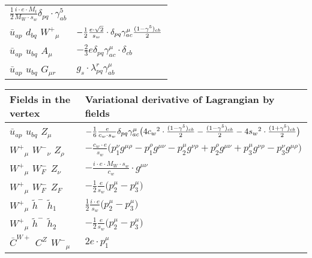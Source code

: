 \begin{center}
\begin{tabular}{|l|l|}
	$\frac{1}{2}\frac{ i \cdot e \cdot M_t}{ M_W \cdot s_w}\delta_{p q} \cdot \gamma_{a b}^5 $\\[2mm]
$\bar{u}{}_{a p }$ \phantom{-} $d{}_{b q }$ \phantom{-} $W^+{}_{\mu }$ \phantom{-}  &
	$-\frac{1}{2}\frac{ e \cdot\sqrt{2}}{ s_w}\cdot \delta_{p q} \gamma_{a c}^\mu {(1-\gamma^5)_{c b}\over 2} $\\[2mm]
$\bar{u}{}_{a p }$ \phantom{-} $u{}_{b q }$ \phantom{-} ${A}_{\mu }$ \phantom{-}  &
	$-\frac{2}{3} e\delta_{p q} \gamma_{a c}^\mu \cdot \delta_{c b} $\\[2mm]
$\bar{u}{}_{a p }$ \phantom{-} $u{}_{b q }$ \phantom{-} ${G}_{\mu r }$ \phantom{-}  &
	$ g_s\cdot \lambda_{p q}^r \gamma_{a b}^\mu $\\ \hline
\end{tabular}

\begin{tabular}{|l|l|} \hline
Fields in the vertex & Variational derivative of Lagrangian by fields \\ \hline
$\bar{u}{}_{a p }$ \phantom{-} $u{}_{b q }$ \phantom{-} ${Z}_{\mu }$ \phantom{-}  &
	$-\frac{1}{6}\frac{ e}{ c_w \cdot s_w}\delta_{p q} \gamma_{a c}^\mu \big(4 c_w{}^2 \cdot {(1-\gamma^5)_{c b}\over 2} -{(1-\gamma^5)_{c b}\over 2} -4 s_w{}^2 \cdot {(1+\gamma^5)_{c b}\over 2} \big)$\\[2mm]
$W^+{}_{\mu }$ \phantom{-} $W^-{}_{\nu }$ \phantom{-} ${Z}_{\rho }$ \phantom{-}  &
	$-\frac{ c_w \cdot e}{ s_w}\big(p_1^\nu g^{\mu \rho} -p_1^\rho g^{\mu \nu} -p_2^\mu g^{\nu \rho} +p_2^\rho g^{\mu \nu} +p_3^\mu g^{\nu \rho} -p_3^\nu g^{\mu \rho} \big)$\\[2mm]
$W^+{}_{\mu }$ \phantom{-} $W^-_F{}_{}$ \phantom{-} ${Z}_{\nu }$ \phantom{-}  &
	$-\frac{ i \cdot e \cdot M_W \cdot s_w}{ c_w}\cdot g^{\mu \nu} $\\[2mm]
$W^+{}_{\mu }$ \phantom{-} $W^-_F{}_{}$ \phantom{-} $Z_F{}_{}$ \phantom{-}  &
	$-\frac{1}{2}\frac{ e}{ s_w}\big(p_2^\mu -p_3^\mu \big)$\\[2mm]
$W^+{}_{\mu }$ \phantom{-} $\widetilde{h}^-{}_{}$ \phantom{-} $\widetilde{h}_1{}_{}$ \phantom{-}  &
	$\frac{1}{2}\frac{ i \cdot e}{ s_w}\big(p_2^\mu -p_3^\mu \big)$\\[2mm]
$W^+{}_{\mu }$ \phantom{-} $\widetilde{h}^-{}_{}$ \phantom{-} $\widetilde{h}_2{}_{}$ \phantom{-}  &
	$-\frac{1}{2}\frac{ e}{ s_w}\big(p_2^\mu -p_3^\mu \big)$\\[2mm]
$\bar{C}^{W+}{}_{}$ \phantom{-} $C^{Z}{}_{}$ \phantom{-} $W^-{}_{\mu }$ \phantom{-}  &
	$2 e\cdot p_1^\mu $\\[2mm]

\end{tabular}
\end{center}
